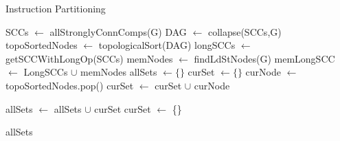 \begin{algorithm}[t]
  \caption{Instruction Partitioning}\label{algo1}
  \begin{algorithmic}[1]
    \State SCCs $\gets$ allStronglyConnComps(G)
  \State DAG $\gets$ collapse(SCCs,G)
  \State topoSortedNodes $\gets$ topologicalSort(DAG)
  \State longSCCs $\gets$ getSCCWithLongOp(SCCs)
  \State memNodes $\gets$ findLdStNodes(G)
  \State memLongSCC $\gets$ LongSCCs $\cup$ memNodes
  \State allSets $\gets \{\}$
  \State curSet $\gets \{\}$
     \State curNode $\gets$ topoSortedNodes.pop()
     \State curSet $\gets$ curSet $\cup$ curNode
    
    \State allSets $\gets$ allSets $\cup$ curSet
    \State curSet $\gets$ \{\}
     \EndIf

     
  \EndWhile
  \State \Return allSets 
  
    \EndProcedure
  

\end{algorithmic}
\end{algorithm}
